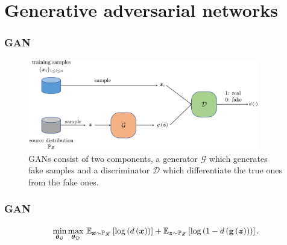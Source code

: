 \documentclass[presentation]{beamer}
\begin{document}
\section{Generative adversarial networks}

\begin{frame}
    \frametitle{GAN}
        
    \begin{figure}
        \centering\includegraphics[width=0.9\textwidth]{GAN}
        \caption{GANs consist of two components, a generator $\mathcal{G}$ which generates fake samples and a discriminator $\mathcal{D}$ which differentiate the true ones from the fake ones. \label{fig:GAN}}
    \end{figure}

\end{frame}

\begin{frame}
    \frametitle{GAN}

    \begin{equation}
        \min_{\text{\boldmath $\theta$}_{\mathcal{G}}}\max_{\text{\boldmath $\theta$}_{\mathcal{D}}}
        \,\mathbb{E}_{\bm{x}\sim\mathbb{P}_{\bm{X}}}\left[\log
        \left(d\left(\bm{x}\right)\right)\right]
        +\mathbb{E}_{\bm{z}\sim\mathbb{P}_{\bm{Z}}}\left[\log\left(1-d\left(\mathrm{\bf g}\left(\bm{z}\right)\right)\right)\right].\label{eq:GAN-original}
    \end{equation}

\end{frame}
\end{document}

